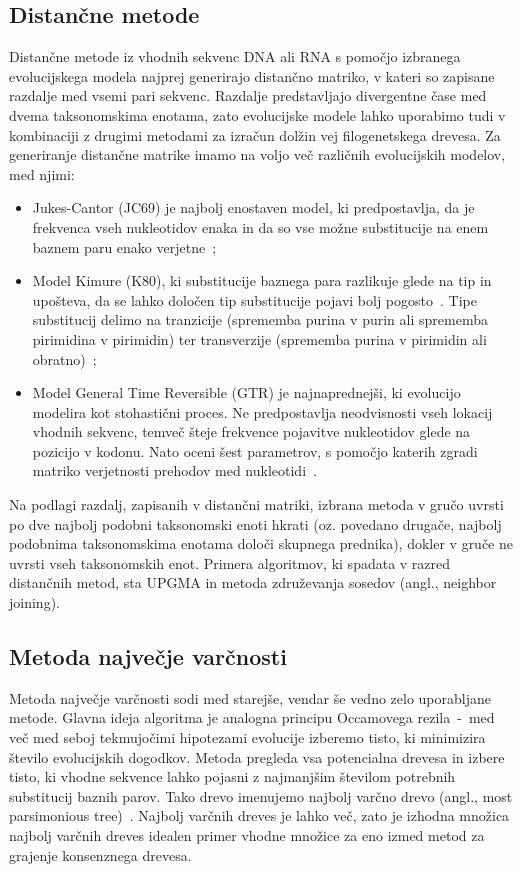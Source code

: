 \documentclass[a4paper, 12pt]{book}
\begin{document}
\subsection{Distančne metode}
Distančne metode iz vhodnih sekvenc DNA ali RNA s pomočjo izbranega evolucijskega 
modela najprej generirajo distančno matriko, v kateri so zapisane razdalje med 
vsemi pari sekvenc. Razdalje predstavljajo divergentne čase med dvema taksonomskima 
enotama, zato evolucijske modele lahko uporabimo tudi v kombinaciji z drugimi 
metodami za izračun dolžin vej filogenetskega drevesa. Za generiranje distančne 
matrike imamo na voljo več različnih evolucijskih modelov, med njimi:
	\begin{itemize}
		\item Jukes-Cantor (JC69) je najbolj enostaven model, ki predpostavlja, 
			  da je frekvenca vseh nukleotidov enaka in da so vse možne 
			  substitucije na enem baznem paru enako verjetne~\cite{jc};
		\item Model Kimure (K80), ki substitucije baznega para razlikuje glede 
			  na tip in upošteva, da se lahko določen tip substitucije pojavi 
			  bolj pogosto~\cite{k80}. Tipe substitucij delimo na tranzicije 
			  (sprememba purina v purin ali sprememba pirimidina v pirimidin) 
			  ter transverzije (sprememba purina v pirimidin ali obratno)~\cite{fel};
		\item Model General Time Reversible (GTR) je najnaprednejši, ki 
			  evolucijo modelira kot stohastični proces. Ne predpostavlja 
			  neodvisnosti vseh lokacij vhodnih sekvenc, temveč šteje frekvence 
			  pojavitve nukleotidov glede na pozicijo v kodonu. Nato oceni šest
			  parametrov, s pomočjo katerih zgradi matriko verjetnosti
			  prehodov med nukleotidi~\cite{gtr}.
	\end{itemize}

\noindent Na podlagi razdalj, zapisanih v distančni matriki, izbrana metoda v gručo 
uvrsti po dve najbolj podobni taksonomski enoti hkrati (oz. povedano drugače, 
najbolj podobnima taksonomskima enotama določi skupnega prednika), dokler v 
gruče ne uvrsti vseh taksonomskih enot. Primera algoritmov, ki spadata v razred 
distančnih metod, sta UPGMA in metoda združevanja sosedov (angl., neighbor joining). 

\subsection{Metoda največje varčnosti}
Metoda največje varčnosti sodi med starejše, vendar še vedno zelo uporabljane 
metode. Glavna ideja algoritma je analogna principu Occamovega rezila~-~med več 
med seboj tekmujočimi hipotezami evolucije izberemo tisto, ki minimizira število 
evolucijskih dogodkov. Metoda pregleda vsa potencialna drevesa in izbere tisto, 
ki vhodne sekvence lahko pojasni z najmanjšim številom potrebnih substitucij 
baznih parov. Tako drevo imenujemo najbolj varčno drevo 
(angl., most parsimonious tree)~\cite{parsimony}. Najbolj varčnih dreves je lahko
več, zato je izhodna množica najbolj varčnih dreves idealen primer vhodne množice 
za eno izmed metod za grajenje konsenznega drevesa.
\end{document}
